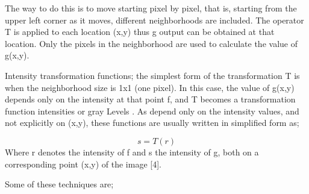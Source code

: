 The way to do this is to move starting pixel by pixel, that is, starting from the upper left corner as it moves, different neighborhoods are included. The operator T is applied to each location (x,y) thus g output can be obtained at that location. Only the pixels in the neighborhood are used to calculate the value of g(x,y).

Intensity transformation functions; the simplest form of the transformation T is when the neighborhood size is 1x1 (one pixel). In this case, the value of g(x,y) depends only on the intensity at that point f, and T becomes a transformation function intensities or gray Levels \cite{dip2}. As depend only on the intensity values, and not explicitly on (x,y), these functions are usually written in simplified form as;

\[
	s=T(r)
\]
Where r denotes the intensity of f and s the intensity of g, both on a corresponding point (x,y) of the image [4].

Some of these techniques are;

